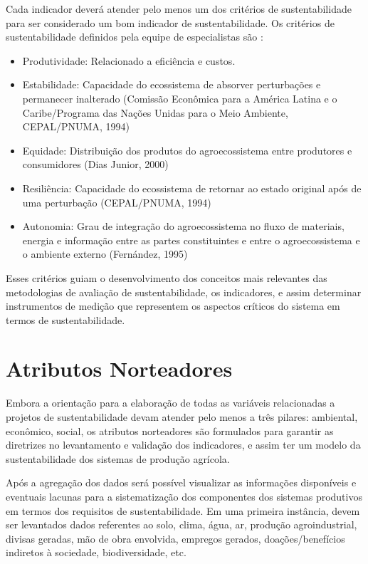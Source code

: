 Cada indicador deverá atender pelo menos um dos critérios de sustentabilidade
para ser considerado um bom indicador de sustentabilidade. Os critérios
de sustentabilidade definidos pela equipe de especialistas são \citep{moura2002indicadores}:
\begin{itemize}
\item Produtividade: Relacionado a eficiência e custos.
\item Estabilidade: Capacidade do ecossistema de absorver perturbações e
permanecer inalterado (Comissão Econômica para a América Latina e
o Caribe/Programa das Nações Unidas para o Meio Ambiente, CEPAL/PNUMA,
1994) 
\item Equidade: Distribuição dos produtos do agroecossistema entre produtores
e consumidores (Dias Junior, 2000) 
\item Resiliência: Capacidade do ecossistema de retornar ao estado original
após de uma perturbação (CEPAL/PNUMA, 1994) 
\item Autonomia: Grau de integração do agroecossistema no fluxo de materiais,
energia e informação entre as partes constituintes e entre o agroecossistema
e o ambiente externo (Fernández, 1995)
\end{itemize}
Esses critérios guiam o desenvolvimento dos conceitos mais relevantes
das metodologias de avaliação de sustentabilidade, os indicadores,
e assim determinar instrumentos de medição que representem os aspectos
críticos do sistema em termos de sustentabilidade.

\section{Atributos Norteadores}

Embora a orientação para a elaboração de todas as variáveis relacionadas
a projetos de sustentabilidade devam atender pelo menos a três pilares:
ambiental, econômico, social, os atributos norteadores são formulados
para garantir as diretrizes no levantamento e validação dos indicadores,
e assim ter um modelo da sustentabilidade dos sistemas de produção
agrícola.

Após a agregação dos dados será possível visualizar as informações
disponíveis e eventuais lacunas para a sistematização dos componentes
dos sistemas produtivos em termos dos requisitos de sustentabilidade.
Em uma primeira instância, devem ser levantados dados referentes ao
solo, clima, água, ar, produção agroindustrial, divisas geradas, mão
de obra envolvida, empregos gerados, doações/benefícios indiretos
à sociedade, biodiversidade, etc.

